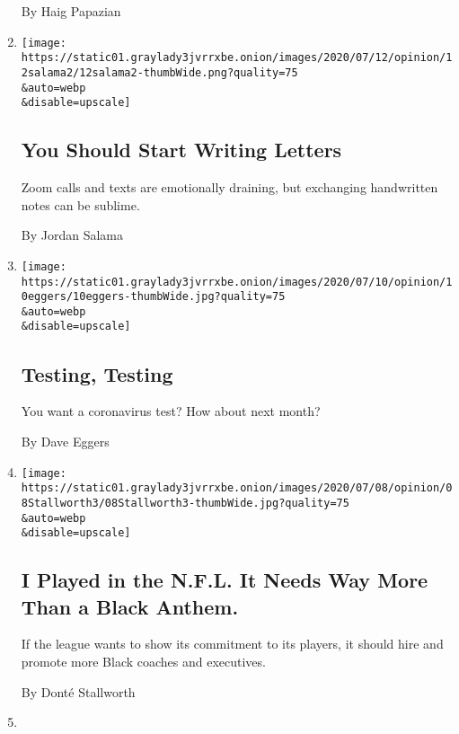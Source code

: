 \begin{enumerate}
  By Haig Papazian
\item
  \href{/2020/07/12/opinion/letter-writing-coronavirus.html}{}

  \texttt{[image: https://static01.graylady3jvrrxbe.onion/images/2020/07/12/opinion/12salama2/12salama2-thumbWide.png?quality=75\\\&auto=webp\\\&disable=upscale]}

  \hypertarget{you-should-start-writing-letters}{%
  \subsection{You Should Start Writing
  Letters}\label{you-should-start-writing-letters}}

  Zoom calls and texts are emotionally draining, but exchanging
  handwritten notes can be sublime.

  By Jordan Salama
\item
  \href{/2020/07/10/opinion/culture/coronavirus-testing-eggers.html}{}

  \texttt{[image: https://static01.graylady3jvrrxbe.onion/images/2020/07/10/opinion/10eggers/10eggers-thumbWide.jpg?quality=75\\\&auto=webp\\\&disable=upscale]}

  \hypertarget{testing-testing}{%
  \subsection{Testing, Testing}\label{testing-testing}}

  You want a coronavirus test? How about next month?

  By Dave Eggers
\item
  \href{/2020/07/08/opinion/culture/NFL-black-anthem-kaepernick-trump.html}{}

  \texttt{[image: https://static01.graylady3jvrrxbe.onion/images/2020/07/08/opinion/08Stallworth3/08Stallworth3-thumbWide.jpg?quality=75\\\&auto=webp\\\&disable=upscale]}

  \hypertarget{i-played-in-the-nfl-it-needs-way-more-than-a-black-anthem}{%
  \subsection{I Played in the N.F.L. It Needs Way More Than a Black
  Anthem.}\label{i-played-in-the-nfl-it-needs-way-more-than-a-black-anthem}}

  If the league wants to show its commitment to its players, it should
  hire and promote more Black coaches and executives.

  By Donté Stallworth
\item
  \href{/2020/07/06/opinion/thomas-jefferson-memorial-truscott.html}{}


\end{enumerate}
